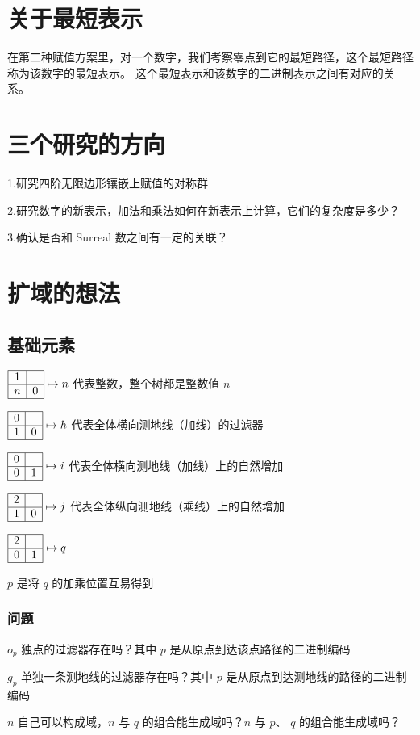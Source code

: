 \documentclass[a4paper,12pt]{article}
\begin{document}
\section{关于最短表示}

在第二种赋值方案里，对一个数字，我们考察零点到它的最短路径，这个最短路径称为该数字的最短表示。
这个最短表示和该数字的二进制表示之间有对应的关系。

\section{三个研究的方向}

1.研究四阶无限边形镶嵌上赋值的对称群

2.研究数字的新表示，加法和乘法如何在新表示上计算，它们的复杂度是多少？

3.确认是否和 Surreal 数之间有一定的关联？


\section{扩域的想法}

\subsection{基础元素}

$\begin{array}{|c|c|}\hline 1&\space\\\hline n&0\\\hline\end{array} \mapsto n$ 代表整数，整个树都是整数值 $n$

$\begin{array}{|c|c|}\hline0&\space\\\hline 1&0\\\hline\end{array} \mapsto h$ 代表全体横向测地线（加线）的过滤器

$\begin{array}{|c|c|}\hline0&\space\\\hline 0&1\\\hline\end{array} \mapsto i$ 代表全体横向测地线（加线）上的自然增加

$\begin{array}{|c|c|}\hline2&\space\\\hline 1&0\\\hline\end{array} \mapsto j$ 代表全体纵向测地线（乘线）上的自然增加

$\begin{array}{|c|c|}\hline2&\space\\\hline 0&1\\\hline\end{array} \mapsto q$

$p$ 是将 $q$ 的加乘位置互易得到

\subsubsection{问题}

$o_p$ 独点的过滤器存在吗？其中 $p$ 是从原点到达该点路径的二进制编码

$g_p$ 单独一条测地线的过滤器存在吗？其中 $p$ 是从原点到达测地线的路径的二进制编码

$n$ 自己可以构成域，$n$ 与 $q$ 的组合能生成域吗？$n$ 与 $p$、 $q$ 的组合能生成域吗？
\end{document}
